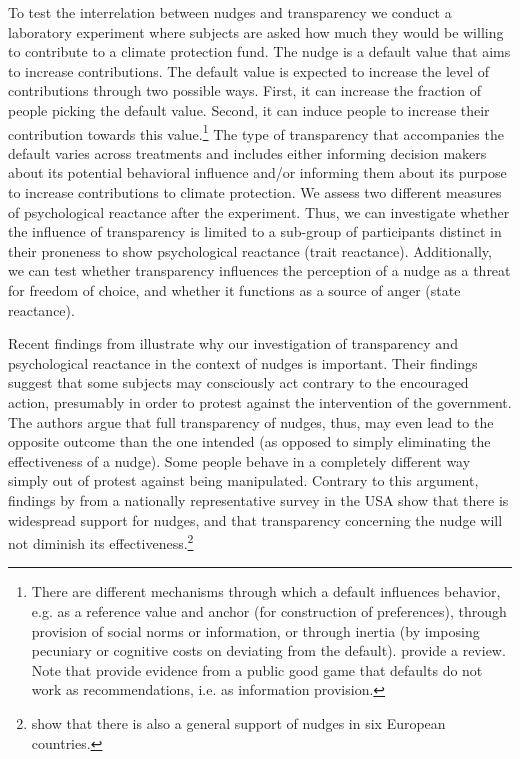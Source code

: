 \documentclass[review, authoryear,12pt]{elsarticle}
\begin{document}
To test the interrelation between nudges and transparency we conduct a laboratory experiment where subjects are asked how much they would be willing to contribute to a climate protection fund. The nudge is a default value that aims to increase contributions. The default value is expected to increase the level of contributions through two possible ways. First, it can increase the fraction of people picking the default value. Second, it can induce people to increase their contribution towards this value.\footnote{There are different mechanisms through which a default influences behavior, e.g. as a reference value and anchor (for construction of preferences), through provision of social norms or information, or through inertia (by imposing pecuniary or cognitive costs on deviating from the default). \cite{Sunstein.2016d} provide a review. Note that \cite{Cappelletti.2014} provide evidence from a public good game that defaults do not work as recommendations, i.e. as information provision.}  The type of transparency that accompanies the default varies across treatments and includes either informing decision makers about its potential behavioral influence and/or informing them about its purpose to increase contributions to climate protection. We assess two different measures of psychological reactance after the experiment. Thus, we can investigate whether the influence of transparency is limited to a sub-group of participants distinct in their proneness to show psychological reactance (trait reactance). Additionally, we can test whether transparency influences the perception of a nudge as a threat for freedom of choice, and whether it functions as a source of anger (state reactance).

Recent findings from \cite{Arad.2015} illustrate why our investigation of transparency and psychological reactance in the context of nudges is important. Their findings suggest that some subjects may consciously act contrary to the encouraged action, presumably in order to protest against the intervention of the government. The authors argue that full transparency of nudges, thus, may even lead to the opposite outcome than the one intended (as opposed to simply eliminating the effectiveness of a nudge). Some people behave in a completely different way simply out of protest against being manipulated. Contrary to this argument, findings by \cite{Sunstein.2016} from a nationally representative survey in the USA show that there is widespread support for nudges, and that transparency concerning the nudge will not diminish its effectiveness.\footnote{\cite{Reisch.2016} show that there is also a general support of nudges in six European countries.}
\end{document}
